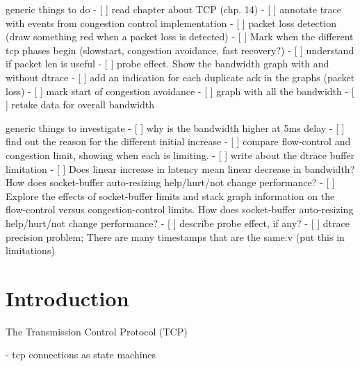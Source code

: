 \documentclass[a4paper,10pt]{article}
\begin{document}
generic things to do 
- [ ] read chapter about TCP (chp. 14)
- [ ] annotate trace with events from congestion control implementation
- [ ] packet loss detection (draw something red when a packet loss is detected)
- [ ] Mark when  the different tcp phases begin (slowstart, congestion avoidance, fast recovery?)
- [ ] understand if packet len is useful
- [ ] probe effect. Show the bandwidth graph with and without dtrace
- [ ] add an indication for each duplicate ack in the graphs (packet loss)
- [ ] mark start of congestion avoidance
- [ ] graph with all the bandwidth
- [ ] retake data for overall bandwidth

generic things to investigate
- [ ] why is the bandwidth higher at 5ms delay
- [ ] find out the reason for the different initial increase
- [ ] compare flow-control and congestion limit, showing when each is limiting.
- [ ] write about the dtrace buffer limitation
- [ ] Does linear increase in latency mean linear decrease in bandwidth? How does socket-buffer auto-resizing help/hurt/not change performance?
- [ ] Explore the effects of socket-buffer limits and stack graph information on the flow-control versus congestion-control limits. How does socket-buffer auto-resizing help/hurt/not change performance? 
- [ ] describe probe effect, if any?
- [ ] dtrace precision problem; There are many timestamps that are the same:v (put this in limitations)
\fi

\clearpage

\setcounter{page}{1}

\section{Introduction}

The Transmission Control Protocol (TCP)

- tcp connections as state machines
\end{document}
